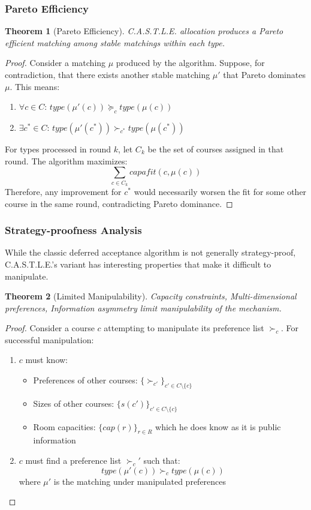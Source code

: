 \documentclass[a4paper, oneside]{article}
\theoremstyle{plain}
\newtheorem{theorem}{Theorem}
\newcommand{\castle}{C{\small.}A{\small.}S{\small.}T{\small.}L{\small.}E{\small.}}
\begin{document}
\subsubsection{Pareto Efficiency}
\begin{theorem}[Pareto Efficiency]
	\castle{} allocation produces a Pareto efficient matching among stable matchings within each type.
\end{theorem}

\begin{proof}
	Consider a matching $\mu$ produced by the algorithm. Suppose, for contradiction, that there exists another stable matching $\mu'$ that Pareto dominates $\mu$.
	This means:
	\begin{enumerate}
		\item $\forall c \in C$: $type(\mu'(c)) \succeq_c type(\mu(c))$
		\item $\exists c^* \in C$: $type(\mu'(c^*)) \succ_{c^*} type(\mu(c^*))$
	\end{enumerate}
	For types processed in round $k$, let $C_k$ be the set of courses assigned in that round. The algorithm maximizes:
	$$\sum_{c \in C_k} capafit(c, \mu(c))$$
	Therefore, any improvement for $c^*$ would necessarily worsen the fit for some other course in the same round, contradicting Pareto dominance.
\end{proof}

\subsubsection{Strategy-proofness Analysis}

While the classic deferred acceptance algorithm is not generally strategy-proof, \castle{}'s variant has interesting properties that make it difficult to manipulate.
\begin{theorem}[Limited Manipulability]
	Capacity constraints, Multi-dimensional preferences, Information asymmetry limit manipulability of the mechanism.
\end{theorem}

\begin{proof}
	Consider a course $c$ attempting to manipulate its preference list $\succ_c$. For successful manipulation:
	\begin{enumerate}
		\item $c$ must know:
		      \begin{itemize}
			      \item Preferences of other courses: $\{\succ_{c'}\}_{c' \in C\setminus\{c\}}$
			      \item Sizes of other courses: $\{s(c')\}_{c' \in C\setminus\{c\}}$
			      \item Room capacities: $\{cap(r)\}_{r \in R}$ which he does know as it is public information
		      \end{itemize}
		\item $c$ must find a preference list $\succ_c'$ such that:
		      $$type(\mu'(c)) \succ_c type(\mu(c))$$
		      where $\mu'$ is the matching under manipulated preferences
	\end{enumerate}
\end{proof}
\end{document}
